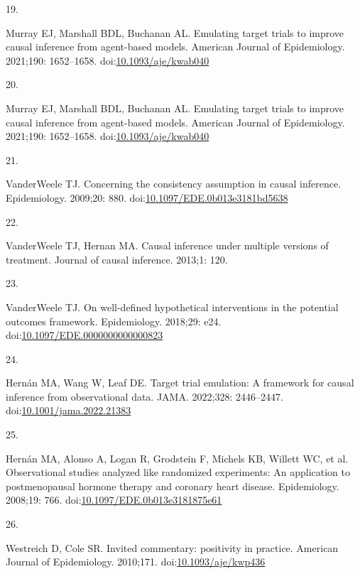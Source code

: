 \documentclass[
  singlecolumn]{article}
\newlength{\cslhangindent}
\newlength{\csllabelwidth}
\newlength{\cslentryspacingunit} %
\newenvironment{CSLReferences}[2] %
 {%
  \setlength{\parindent}{0pt}
  \ifodd #1
  \let\oldpar\par
  \def\par{\hangindent=\cslhangindent\oldpar}
  \fi
  \setlength{\parskip}{#2\cslentryspacingunit}
 }%
 {}
\newcommand{\CSLLeftMargin}[1]{\parbox[t]{\csllabelwidth}{#1}}
\newcommand{\CSLRightInline}[1]{\parbox[t]{\linewidth - \csllabelwidth}{#1}\break}
\begin{document}
\begin{CSLReferences}{0}{0}
\leavevmode{}%
\CSLLeftMargin{19. }%
\CSLRightInline{Murray EJ, Marshall BDL, Buchanan AL. Emulating target
trials to improve causal inference from agent-based models. American
Journal of Epidemiology. 2021;190: 1652--1658.
doi:\href{https://doi.org/10.1093/aje/kwab040}{10.1093/aje/kwab040}}

\leavevmode{}%
\CSLLeftMargin{20. }%
\CSLRightInline{Murray EJ, Marshall BDL, Buchanan AL. Emulating target
trials to improve causal inference from agent-based models. American
Journal of Epidemiology. 2021;190: 1652--1658.
doi:\href{https://doi.org/10.1093/aje/kwab040}{10.1093/aje/kwab040}}

\leavevmode{}%
\CSLLeftMargin{21. }%
\CSLRightInline{VanderWeele TJ. Concerning the consistency assumption in
causal inference. Epidemiology. 2009;20: 880.
doi:\href{https://doi.org/10.1097/EDE.0b013e3181bd5638}{10.1097/EDE.0b013e3181bd5638}}

\leavevmode{}%
\CSLLeftMargin{22. }%
\CSLRightInline{VanderWeele TJ, Hernan MA. Causal inference under
multiple versions of treatment. Journal of causal inference. 2013;1:
120. }

\leavevmode{}%
\CSLLeftMargin{23. }%
\CSLRightInline{VanderWeele TJ. On well-defined hypothetical
interventions in the potential outcomes framework. Epidemiology.
2018;29: e24.
doi:\href{https://doi.org/10.1097/EDE.0000000000000823}{10.1097/EDE.0000000000000823}}

\leavevmode{}%
\CSLLeftMargin{24. }%
\CSLRightInline{Hernán MA, Wang W, Leaf DE. Target trial emulation: A
framework for causal inference from observational data. JAMA. 2022;328:
2446--2447.
doi:\href{https://doi.org/10.1001/jama.2022.21383}{10.1001/jama.2022.21383}}

\leavevmode{}%
\CSLLeftMargin{25. }%
\CSLRightInline{Hernán MA, Alonso A, Logan R, Grodstein F, Michels KB,
Willett WC, et al. Observational studies analyzed like randomized
experiments: An application to postmenopausal hormone therapy and
coronary heart disease. Epidemiology. 2008;19: 766.
doi:\href{https://doi.org/10.1097/EDE.0b013e3181875e61}{10.1097/EDE.0b013e3181875e61}}

\leavevmode{}%
\CSLLeftMargin{26. }%
\CSLRightInline{Westreich D, Cole SR. Invited commentary: positivity in
practice. American Journal of Epidemiology. 2010;171.
doi:\href{https://doi.org/10.1093/aje/kwp436}{10.1093/aje/kwp436}}


\end{CSLReferences}
\end{document}
